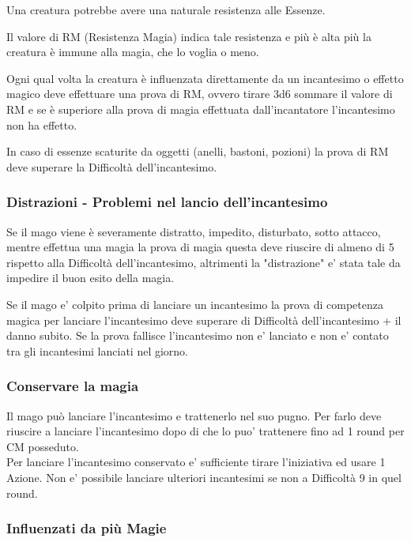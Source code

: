 Una creatura potrebbe avere una naturale resistenza alle Essenze.

Il valore di RM (Resistenza Magia) indica tale resistenza e più è alta più la creatura è immune alla magia, che lo voglia o meno.

Ogni qual volta la creatura è influenzata direttamente da un incantesimo o effetto magico deve effettuare una prova di RM, ovvero tirare 3d6 sommare il valore di RM e se è superiore alla prova di magia effettuata dall'incantatore l'incantesimo non ha effetto.

In caso di essenze scaturite da oggetti (anelli, bastoni, pozioni) la prova di RM deve superare la Difficoltà dell'incantesimo.

\subsubsection{Distrazioni - Problemi nel lancio dell'incantesimo}

Se il mago viene è severamente distratto, impedito, disturbato, sotto attacco, mentre effettua una magia la prova di magia questa deve riuscire di almeno di 5 rispetto alla Difficoltà dell'incantesimo, altrimenti la "distrazione" e' stata tale da impedire il buon esito della magia.

Se il mago e' colpito prima di lanciare un incantesimo la prova di competenza magica per lanciare l'incantesimo deve superare di Difficoltà dell'incantesimo + il danno subito. Se la prova fallisce l'incantesimo non e' lanciato e non e' contato tra gli incantesimi lanciati nel giorno.

\subsubsection{Conservare la magia}

Il mago può lanciare l'incantesimo e trattenerlo nel suo pugno. Per farlo deve riuscire a lanciare l'incantesimo dopo di che lo puo' trattenere fino ad 1 round per CM posseduto.\\
Per lanciare l'incantesimo conservato e' sufficiente tirare l'iniziativa ed usare 1 Azione. Non e' possibile lanciare ulteriori incantesimi se non a Difficoltà 9 in quel round.

\subsubsection{Influenzati da più Magie}

